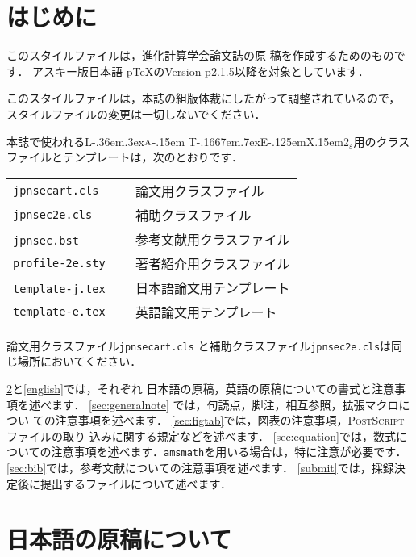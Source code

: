 \documentclass{jpnsec2e}
\author{%
\name{}{}{}
\affiliation{進化計算学会編集委員会}%
{Editorial Board, Japanese Society for Evolutionary Computation}%
{editor@jpnsec.org,
http://www.jpnsec.org/journal.html}
}
\def\LaTeX{{\rm L\kern-.36em\raise.3ex\hbox{$\scriptstyle {\rm A}$}\kern-.15em
 T\kern-.1667em\lower.7ex\hbox{E}\kern-.125emX}}
\def\LaTeXe{\LaTeX\kern.15em2$_{\textstyle\varepsilon}$}
\newcommand{\ltt}[1]{\texttt{\small{}#1}}
\begin{document}
\maketitle

\section{はじめに}\label{sec:intro}

このスタイルファイルは，進化計算学会論文誌の原
稿を作成するためのものです．
アスキー版日本語 p\TeX{}のVersion p2.1.5以降を対象としています．


このスタイルファイルは，本誌の組版体裁にしたがって調整されているので，
スタイルファイルの変更は一切しないでください．

本誌で使われる\LaTeXe 用のクラスファイルとテンプレートは，次のとおりです．
\medskip

{\small
\begin{tabular}{ll}
\hline
\ltt{jpnsecart.cls}    & 論文用クラスファイル\\
\ltt{jpnsec2e.cls}     & 補助クラスファイル\\
\ltt{jpnsec.bst}     　& 参考文献用クラスファイル\\
\ltt{profile-2e.sty}   & 著者紹介用クラスファイル\\\hline
\ltt{template-j.tex} 　& 日本語論文用テンプレート\\
\ltt{template-e.tex}   & 英語論文用テンプレート\\\hline
\end{tabular}
}
\medskip

論文用クラスファイル\ltt{jpnsecart.cls} と補助クラスファイル\ltt{jpnsec2e.cls}は同じ場所においてください．


\ref{japanese}と\ref{english}では，それぞれ
日本語の原稿，英語の原稿についての書式と注意事項を述べます．
\ref{sec:generalnote} では，句読点，脚注，相互参照，拡張マクロについ
ての注意事項を述べます．
\ref{sec:figtab}では，図表の注意事項，\textsc{PostScript}ファイルの取り
込みに関する規定などを述べます．
\ref{sec:equation}では，数式についての注意事項を述べます．\ltt{amsmath}を用いる場合は，特に注意が必要です．
\ref{sec:bib}では，参考文献についての注意事項を述べます．
\ref{submit}では，採録決定後に提出するファイルについて述べます．

\section{日本語の原稿について}\label{japanese}
\end{document}
